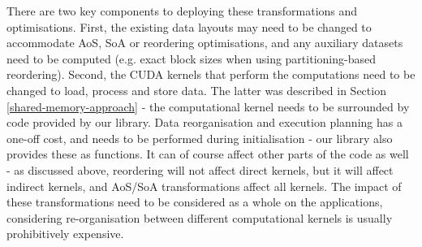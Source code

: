 There are two key components to deploying these transformations and optimisations. First, the existing data layouts may need to be changed to accommodate AoS, SoA or reordering optimisations, and any auxiliary datasets need to be computed (e.g. exact block sizes when using partitioning-based reordering). Second, the CUDA kernels that perform the computations need to be changed to load, process and store data. The latter was described in Section \ref{shared-memory-approach} - the computational kernel needs to be surrounded by code provided by our library. Data reorganisation and execution planning has a one-off cost, and needs to be performed during initialisation - our library also provides these as functions. It can of course affect other parts of the code as well - as discussed above, reordering will not affect direct kernels, but it will affect indirect kernels, and AoS/SoA transformations affect all kernels. The impact of these transformations need to be considered as a whole on the applications, considering re-organisation between different computational kernels is usually prohibitively expensive.
